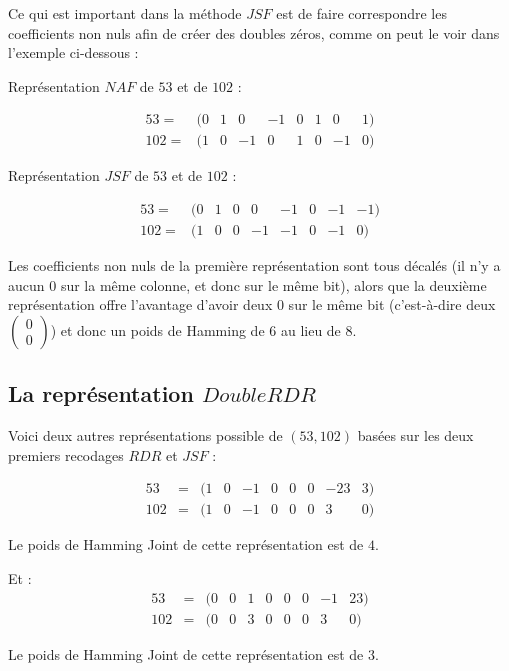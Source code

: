 \documentclass[12pt, a4paper]{memoir}
\newcommand{\doublezero}{\begin{pmatrix} 0 \\ 0 \end{pmatrix}}
\begin{document}
 \vspace{1cm}
  
  Ce qui est important dans la méthode $JSF$ est de faire correspondre les coefficients non nuls afin 
 de créer des doubles zéros, comme on peut le voir dans l'exemple ci-dessous :

 Représentation $NAF$ de $53$ et de $102$ :
 
  $$\begin{array}{cccccccccc}
  53 = & (0 & 1 & 0 & -1 & 0 & 1 & 0 & 1) \\
  102 = & (1 & 0 & -1 & 0 & 1 & 0 & -1 & 0)
  \end{array}$$
  
  Représentation $JSF$ de $53$ et de $102$ :

  $$\begin{array}{cccccccccc}
  53 = & (0 & 1 & 0 & 0 & -1 & 0 & -1 & -1) \\
  102 = & (1 & 0 & 0 & -1 & -1 & 0 & -1 & 0)
  \end{array}$$

  Les coefficients non nuls de la première représentation sont tous décalés (il n'y a aucun $0$ sur la même
  colonne, et donc sur le même bit), alors que la deuxième représentation offre l'avantage d'avoir deux $0$
  sur le même bit (c'est-à-dire deux $\doublezero$) et donc un poids de Hamming de $6$ au lieu de $8$.
 
 \subsection{La représentation $DoubleRDR$}

 Voici deux autres représentations possible de $(53,102)$ basées sur les deux premiers recodages $RDR$ et $JSF$ :
 
   $$\begin{array}{cccccccccc}
  53 & = & (1 & 0 & -1 & 0 & 0 & 0 & -23 & 3) \\
  102 & = & (1 & 0 & -1 & 0 & 0 & 0 & 3 & 0)
 \end{array}$$

  Le poids de Hamming Joint de cette représentation est de $4$.
 
Et :
  $$\begin{array}{cccccccccc}
  53 & = & (0 & 0 & 1 & 0 & 0 & 0 & -1 & 23) \\
  102 & = & (0 & 0 & 3 & 0 & 0 & 0 & 3 & 0)
 \end{array}$$
 
 Le poids de Hamming Joint de cette représentation est de $3$.
 
\end{document}
